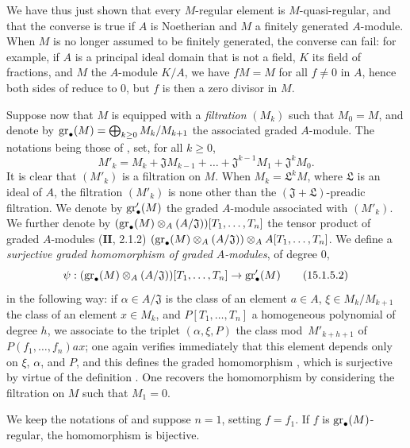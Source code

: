 We have thus just shown that every $M$-regular element is $M$-quasi-regular, and that the converse is true if $A$ is Noetherian and $M$ a finitely generated $A$-module.
When $M$ is no longer assumed to be finitely generated, the converse can fail:
for example, if $A$ is a principal ideal domain that is not a field, $K$ its field of fractions, and $M$ the $A$-module $K/A$, we have $fM=M$ for all $f\neq 0$ in $A$, hence both sides of  reduce to $0$, but $f$ is then a zero divisor in $M$.

\begin{env}[15.1.5]
\label{0.15.1.5}
Suppose now that $M$ is equipped with a \emph{filtration} $(M_k)$ such that $M_0=M$, and denote by $\operatorname{gr}_\bullet(M)=\bigoplus_{k\geq 0}M_k/M_{k+1}$ the associated graded $A$-module.
The notations being those of , set, for all $k\geq 0$,
\[
\label{0.15.1.5.1}
  M'_k = M_k + \mathfrak{J}M_{k-1} + \ldots + \mathfrak{J}^{k-1}M_1 + \mathfrak{J}^k M_0.
\tag{15.1.5.1}
\]
It is clear that $(M'_k)$ is a filtration on $M$.
When $M_k=\mathfrak{L}^k M$, where $\mathfrak{L}$ is an ideal of $A$, the filtration $(M'_k)$ is none other than the $(\mathfrak{J}+\mathfrak{L})$-preadic filtration.
We denote by $\operatorname{gr}'_\bullet(M)$ the graded $A$-module associated with $(M'_k)$.
We further denote by $(\operatorname{gr}_\bullet(M)\otimes_A(A/\mathfrak{J}))[T_1,\ldots,T_n]$ the tensor product of graded $A$-modules ($\mathbf{II}$, 2.1.2)
$(\operatorname{gr}_\bullet(M)\otimes_A(A/\mathfrak{J}))\otimes_A A[T_1,\ldots,T_n]$.
We define a \emph{surjective graded homomorphism of graded $A$-modules}, of degree $0$,
\[
\label{0.15.1.5.2}
  \psi : (\operatorname{gr}_\bullet(M)\otimes_A(A/\mathfrak{J}))[T_1,\ldots,T_n] \to \operatorname{gr}'_\bullet(M)
\tag{15.1.5.2}
\]
in the following way:
if $\alpha\in A/\mathfrak{J}$ is the class of an element $a\in A$, $\xi\in M_k/M_{k+1}$ the class of an element $x\in M_k$, and $P[T_1,\ldots,T_n]$ a homogeneous polynomial of degree $h$, we associate to the triplet $(\alpha,\xi,P)$ the class mod~$M'_{k+h+1}$ of $P(f_1,\ldots,f_n)ax$;
one again verifies immediately that this element depends only on $\xi$, $\alpha$, and $P$, and this defines the graded homomorphism , which is surjective by virtue of the definition .
One recovers the homomorphism  by considering the filtration on $M$ such that $M_1=0$.
\end{env}

\begin{lemma}[15.1.6]
\label{0.15.1.6}
We keep the notations of  and suppose $n=1$, setting $f=f_1$.
If $f$ is $\operatorname{gr}_\bullet(M)$-regular, the homomorphism  is bijective.
\end{lemma}

